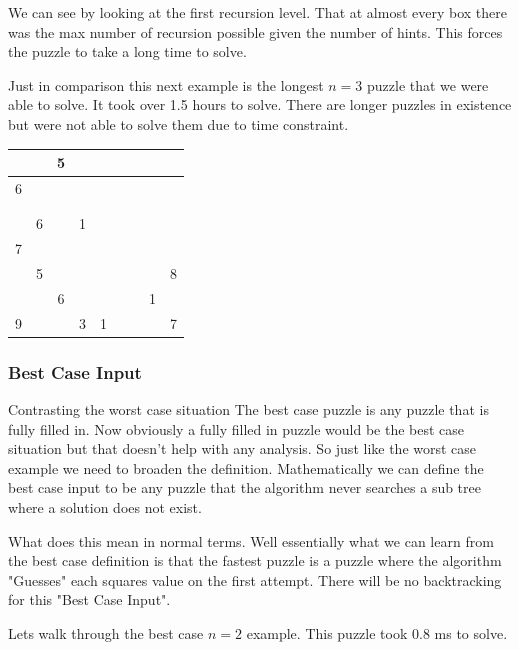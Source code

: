 \documentclass{sig-alternate}
\begin{document}
We can see by looking at the first recursion level. That at almost every box there was the max number of recursion possible given the number of hints. This forces the puzzle to take a long time to solve. 

Just in comparison this next example is the longest $n=3$ puzzle that we were able to solve. It took over 1.5 hours to solve. There are longer puzzles in existence but were not able to solve them due to time constraint. 

\begin{center}
  \begin{tabular}{ | c | c | c | c | c | c | c | c | c |}
    \hline
    	 &  & 5 &  &  &  &  &  &  \\ \hline
        6 &  &  &  &  &  &  &  &  \\ \hline
        &  &  &  &  &  &  &  &  \\ \hline
   		 &  &  &  &  &  &  &  &  \\ \hline
         & 6 &  & 1 &  &  &  &  &  \\ \hline
        7 &  &  &  &  &  &  &  &  \\ \hline
      	 & 5 &  &  & &  &  &  & 8 \\ \hline
         &  & 6 & &  &  &  & 1 &  \\ \hline
        9 &  &  & 3 & 1 &  &  &  & 7 \\ 
    \hline
  \end{tabular}
\end{center}

\subsubsection{Best Case Input}

Contrasting the worst case situation 
The best case puzzle is any puzzle that is fully filled in. Now obviously a fully filled in puzzle would be the best case situation but that doesn't help with any analysis. So just like the worst case example we need to broaden the definition. Mathematically we can define the best case input to be any puzzle that the algorithm never searches a sub tree where a solution does not exist. 

What does this mean in normal terms. Well essentially what we can learn from the best case definition is that the fastest puzzle is a puzzle where the algorithm "Guesses" each squares value on the first attempt. There will be no backtracking for this "Best Case Input". 

Lets walk through the best case $n=2$ example. This puzzle took 0.8 ms to solve. 
\end{document}
